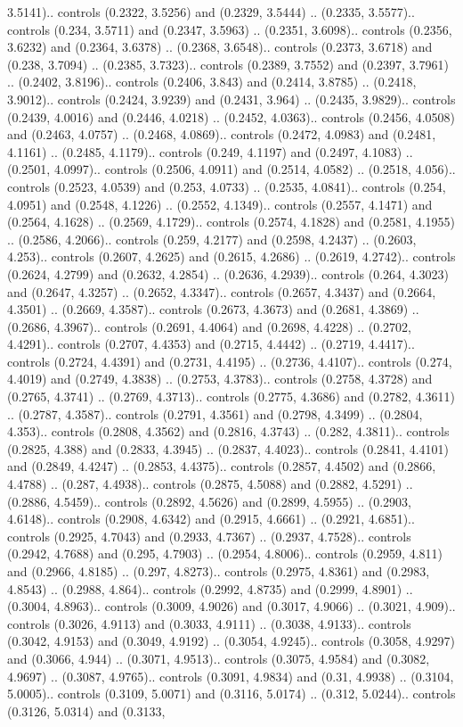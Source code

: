 3.5141).. controls (0.2322, 3.5256) and (0.2329, 3.5444) .. (0.2335, 3.5577).. controls (0.234, 3.5711) and (0.2347, 3.5963) .. (0.2351, 3.6098).. controls (0.2356, 3.6232) and (0.2364, 3.6378) .. (0.2368, 3.6548).. controls (0.2373, 3.6718) and (0.238, 3.7094) .. (0.2385, 3.7323).. controls (0.2389, 3.7552) and (0.2397, 3.7961) .. (0.2402, 3.8196).. controls (0.2406, 3.843) and (0.2414, 3.8785) .. (0.2418, 3.9012).. controls (0.2424, 3.9239) and (0.2431, 3.964) .. (0.2435, 3.9829).. controls (0.2439, 4.0016) and (0.2446, 4.0218) .. (0.2452, 4.0363).. controls (0.2456, 4.0508) and (0.2463, 4.0757) .. (0.2468, 4.0869).. controls (0.2472, 4.0983) and (0.2481, 4.1161) .. (0.2485, 4.1179).. controls (0.249, 4.1197) and (0.2497, 4.1083) .. (0.2501, 4.0997).. controls (0.2506, 4.0911) and (0.2514, 4.0582) .. (0.2518, 4.056).. controls (0.2523, 4.0539) and (0.253, 4.0733) .. (0.2535, 4.0841).. controls (0.254, 4.0951) and (0.2548, 4.1226) .. (0.2552, 4.1349).. controls (0.2557, 4.1471) and (0.2564, 4.1628) .. (0.2569, 4.1729).. controls (0.2574, 4.1828) and (0.2581, 4.1955) .. (0.2586, 4.2066).. controls (0.259, 4.2177) and (0.2598, 4.2437) .. (0.2603, 4.253).. controls (0.2607, 4.2625) and (0.2615, 4.2686) .. (0.2619, 4.2742).. controls (0.2624, 4.2799) and (0.2632, 4.2854) .. (0.2636, 4.2939).. controls (0.264, 4.3023) and (0.2647, 4.3257) .. (0.2652, 4.3347).. controls (0.2657, 4.3437) and (0.2664, 4.3501) .. (0.2669, 4.3587).. controls (0.2673, 4.3673) and (0.2681, 4.3869) .. (0.2686, 4.3967).. controls (0.2691, 4.4064) and (0.2698, 4.4228) .. (0.2702, 4.4291).. controls (0.2707, 4.4353) and (0.2715, 4.4442) .. (0.2719, 4.4417).. controls (0.2724, 4.4391) and (0.2731, 4.4195) .. (0.2736, 4.4107).. controls (0.274, 4.4019) and (0.2749, 4.3838) .. (0.2753, 4.3783).. controls (0.2758, 4.3728) and (0.2765, 4.3741) .. (0.2769, 4.3713).. controls (0.2775, 4.3686) and (0.2782, 4.3611) .. (0.2787, 4.3587).. controls (0.2791, 4.3561) and (0.2798, 4.3499) .. (0.2804, 4.353).. controls (0.2808, 4.3562) and (0.2816, 4.3743) .. (0.282, 4.3811).. controls (0.2825, 4.388) and (0.2833, 4.3945) .. (0.2837, 4.4023).. controls (0.2841, 4.4101) and (0.2849, 4.4247) .. (0.2853, 4.4375).. controls (0.2857, 4.4502) and (0.2866, 4.4788) .. (0.287, 4.4938).. controls (0.2875, 4.5088) and (0.2882, 4.5291) .. (0.2886, 4.5459).. controls (0.2892, 4.5626) and (0.2899, 4.5955) .. (0.2903, 4.6148).. controls (0.2908, 4.6342) and (0.2915, 4.6661) .. (0.2921, 4.6851).. controls (0.2925, 4.7043) and (0.2933, 4.7367) .. (0.2937, 4.7528).. controls (0.2942, 4.7688) and (0.295, 4.7903) .. (0.2954, 4.8006).. controls (0.2959, 4.811) and (0.2966, 4.8185) .. (0.297, 4.8273).. controls (0.2975, 4.8361) and (0.2983, 4.8543) .. (0.2988, 4.864).. controls (0.2992, 4.8735) and (0.2999, 4.8901) .. (0.3004, 4.8963).. controls (0.3009, 4.9026) and (0.3017, 4.9066) .. (0.3021, 4.909).. controls (0.3026, 4.9113) and (0.3033, 4.9111) .. (0.3038, 4.9133).. controls (0.3042, 4.9153) and (0.3049, 4.9192) .. (0.3054, 4.9245).. controls (0.3058, 4.9297) and (0.3066, 4.944) .. (0.3071, 4.9513).. controls (0.3075, 4.9584) and (0.3082, 4.9697) .. (0.3087, 4.9765).. controls (0.3091, 4.9834) and (0.31, 4.9938) .. (0.3104, 5.0005).. controls (0.3109, 5.0071) and (0.3116, 5.0174) .. (0.312, 5.0244).. controls (0.3126, 5.0314) and (0.3133, 